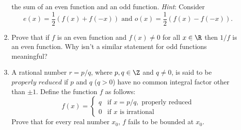 \begin{enumerate}
         the sum of an even function and an odd function. \textit{Hint}:
         Consider
         $$e(x) = \frac{1}{2}(f(x) + f(-x)) \text{ and }
           o(x) = \frac{1}{2}(f(x) - f(-x)).$$
   \item Prove that if $f$ is an even function and $f(x) \neq 0$ for all
         $x \in \R$ then $1/f$ is an even function. Why isn't a similar
         statement for odd functions meaningful?
   \item A rational number $r = p/q$, where $p, q \in \Z$ and $q \neq 0$, is 
         said to be $\textit{properly reduced}$ if $p$ and $q$ ($q > 0$) have no
         common integral factor other than $\pm1$. Define the function $f$ as
         follows:
         \begin{equation*}
            f(x) = \left\{
               \begin{array}{rl}
                  q & \text{if } x = p/q, \text{ properly reduced} \\
                  0 & \text{if } x \text{ is irrational}
               \end{array} \right.
         \end{equation*}
         Prove that for every real number $x_0$, $f$ fails to be bounded at 
         $x_0$.


\end{enumerate}
